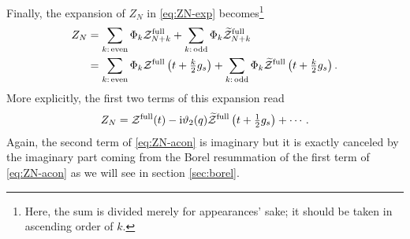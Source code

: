 \documentclass[11pt]{article}
\newcommand{\ri}{{\rm i}}
\renewcommand{\[}{\begin{eqnarray}}
\renewcommand{\]}{\end{eqnarray}}
\newcommand{\varth}{\vartheta}
\newcommand{\Zefull}{{\cal Z}^{\text{full}}}
\newcommand{\Zofull}{{\widetilde{\cal Z}}^{\text{full}}}
\begin{document}
Finally, the expansion of $Z_N$ in \eqref{eq:ZN-exp} becomes\footnote{
Here, the sum is divided merely for appearances' sake;
it should be taken in ascending order of $k$.}
\begin{equation}
\begin{aligned}
 Z_N&=\sum_{k:\,\text{even}}\Phi_k\Zefull_{N+k}+
\sum_{k:\,\text{odd}}\Phi_k\Zofull_{N+k}\\
&=\sum_{k:\,\text{even}}\Phi_k\Zefull\left(t+\tfrac{k}{2}g_s\right)+
\sum_{k:\,\text{odd}}\Phi_k\Zofull\left(t+\tfrac{k}{2}g_s\right).
\end{aligned} 
\label{eq:ZN-instexp}
\end{equation}
%
More explicitly, the first two terms of this expansion read
\begin{align}
Z_N
 =\Zefull(t)
 -\ri\varth_2(q)\Zofull\left(t+\tfrac{1}{2}g_s\right) + \cdots.
\label{eq:ZN-acon}
\end{align}
Again, the second term of \eqref{eq:ZN-acon} is imaginary but it is exactly 
canceled by the imaginary part coming from the Borel resummation
of the first term of \eqref{eq:ZN-acon}
as we will see in section \ref{sec:borel}.
\end{document}
